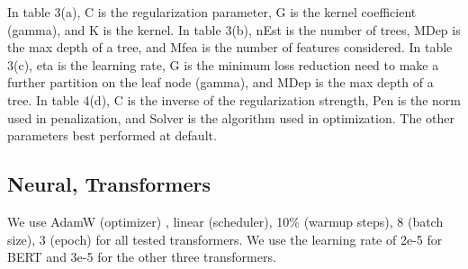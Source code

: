 \documentclass[11pt]{article}
\begin{document}
In table 3(a), C is the regularization parameter, G is the kernel coefficient (gamma), and K is the kernel. In table 3(b), nEst is the number of trees, MDep is the max depth of a tree, and Mfea is the number of features considered. In table 3(c), eta is the learning rate, G is the minimum loss reduction need to make a further partition on the leaf node (gamma), and MDep is the max depth of a tree. In table 4(d), C is the inverse of the regularization strength, Pen is the norm used in penalization, and Solver is the algorithm used in optimization. The other parameters best performed at default.

\subsection{Neural, Transformers}
We use AdamW (optimizer) \citep{kingma2014adam}, linear (scheduler), 10\% (warmup steps), 8 (batch size), 3 (epoch) for all tested transformers. We use the learning rate of 2e-5 for BERT and 3e-5 for the other three transformers.
\end{document}
